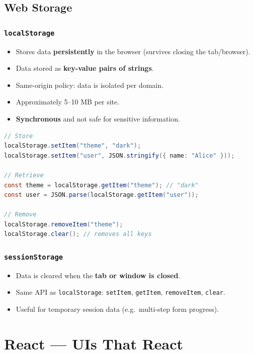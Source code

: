 \documentclass[hidelinks]{article}
\begin{document}
\subsection{Web Storage}
\subsubsection{\texttt{localStorage}}
\begin{itemize}
  \item Stores data \textbf{persistently} in the browser (survives closing the tab/browser).
  \item Data stored as \textbf{key-value pairs of strings}.
  \item Same-origin policy: data is isolated per domain.
  \item Approximately 5--10 MB per site.
  \item \textbf{Synchronous} and not safe for sensitive information.
\end{itemize}
\begin{lstlisting}[language=Java, caption={localStorage usage}]
// Store
localStorage.setItem("theme", "dark");
localStorage.setItem("user", JSON.stringify({ name: "Alice" }));

// Retrieve
const theme = localStorage.getItem("theme"); // "dark"
const user = JSON.parse(localStorage.getItem("user"));

// Remove
localStorage.removeItem("theme");
localStorage.clear(); // removes all keys
\end{lstlisting}

\subsubsection{\texttt{sessionStorage}}
\begin{itemize}
  \item Data is cleared when the \textbf{tab or window is closed}.
  \item Same API as \texttt{localStorage}: \texttt{setItem}, \texttt{getItem}, \texttt{removeItem}, \texttt{clear}.
  \item Useful for temporary session data (e.g.\ multi-step form progress).
\end{itemize}

\newpage
\section{React --- UIs That React}
\end{document}
